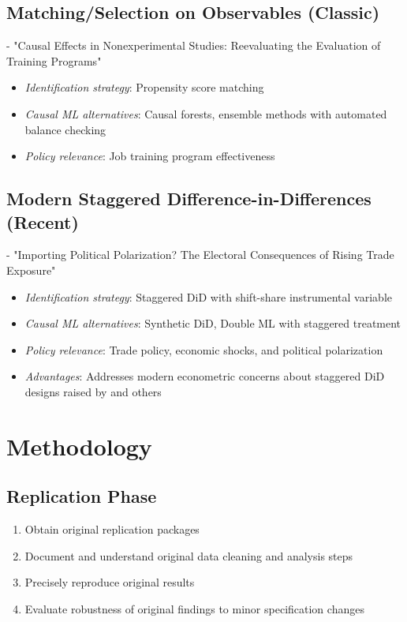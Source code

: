 \documentclass[12pt,a4paper]{article}
\begin{document}
\subsection{Matching/Selection on Observables (Classic)}
\textbf{\citet{dehejia1999causal}} - "Causal Effects in Nonexperimental Studies: Reevaluating the Evaluation of Training Programs"
\begin{itemize}
    \item \textit{Identification strategy}: Propensity score matching
    \item \textit{Causal ML alternatives}: Causal forests, ensemble methods with automated balance checking
    \item \textit{Policy relevance}: Job training program effectiveness
\end{itemize}

\subsection{Modern Staggered Difference-in-Differences (Recent)}
\textbf{\citet{autor2020importing}} - "Importing Political Polarization? The Electoral Consequences of Rising Trade Exposure"
\begin{itemize}
    \item \textit{Identification strategy}: Staggered DiD with shift-share instrumental variable
    \item \textit{Causal ML alternatives}: Synthetic DiD, Double ML with staggered treatment
    \item \textit{Policy relevance}: Trade policy, economic shocks, and political polarization
    \item \textit{Advantages}: Addresses modern econometric concerns about staggered DiD designs raised by \citet{goodman2021difference} and others
\end{itemize}

\section{Methodology}

\subsection{Replication Phase}
\begin{enumerate}
    \item Obtain original replication packages
    \item Document and understand original data cleaning and analysis steps
    \item Precisely reproduce original results
    \item Evaluate robustness of original findings to minor specification changes
\end{enumerate}
\end{document}
